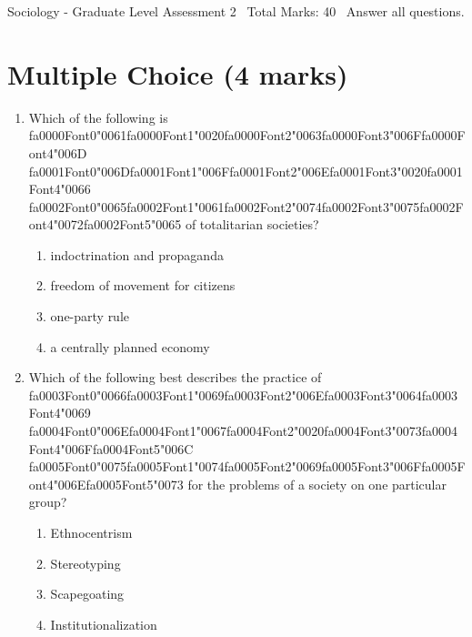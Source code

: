 \documentclass[12pt]{article}
\begin{document}
\begin{center}
Sociology - Graduate Level Assessment 2 \
Total Marks: 40 \
Answer all questions.
\end{center}

\section*{Multiple Choice (4 marks)}
\begin{enumerate}[label=\arabic*.]
\item Which of the following is {\csname fa0000Font0\endcsname\char"0061}{\csname fa0000Font1\endcsname\char"0020}{\csname fa0000Font2\endcsname\char"0063}{\csname fa0000Font3\endcsname\char"006F}{\csname fa0000Font4\endcsname\char"006D} {\csname fa0001Font0\endcsname\char"006D}{\csname fa0001Font1\endcsname\char"006F}{\csname fa0001Font2\endcsname\char"006E}{\csname fa0001Font3\endcsname\char"0020}{\csname fa0001Font4\endcsname\char"0066} {\csname fa0002Font0\endcsname\char"0065}{\csname fa0002Font1\endcsname\char"0061}{\csname fa0002Font2\endcsname\char"0074}{\csname fa0002Font3\endcsname\char"0075}{\csname fa0002Font4\endcsname\char"0072}{\csname fa0002Font5\endcsname\char"0065} of totalitarian societies?
\begin{enumerate}[label=(\alph*)]
    \item indoctrination and propaganda
    \item freedom of movement for citizens
    \item one-party rule
    \item a centrally planned economy
\end{enumerate}
\item Which of the following best describes the practice of {\csname fa0003Font0\endcsname\char"0066}{\csname fa0003Font1\endcsname\char"0069}{\csname fa0003Font2\endcsname\char"006E}{\csname fa0003Font3\endcsname\char"0064}{\csname fa0003Font4\endcsname\char"0069} {\csname fa0004Font0\endcsname\char"006E}{\csname fa0004Font1\endcsname\char"0067}{\csname fa0004Font2\endcsname\char"0020}{\csname fa0004Font3\endcsname\char"0073}{\csname fa0004Font4\endcsname\char"006F}{\csname fa0004Font5\endcsname\char"006C} {\csname fa0005Font0\endcsname\char"0075}{\csname fa0005Font1\endcsname\char"0074}{\csname fa0005Font2\endcsname\char"0069}{\csname fa0005Font3\endcsname\char"006F}{\csname fa0005Font4\endcsname\char"006E}{\csname fa0005Font5\endcsname\char"0073} for the problems of a society on one particular group?
\begin{enumerate}[label=(\alph*)]
    \item Ethnocentrism
    \item Stereotyping
    \item Scapegoating
    \item Institutionalization
\end{enumerate}
\end{enumerate}
\end{document}
